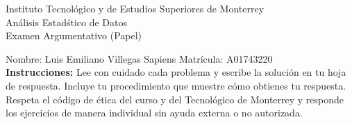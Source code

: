\documentclass[10pt]{report}
\begin{document}
\newpage



\begin{center}
{\large Instituto Tecnol\'{o}gico y de Estudios Superiores de Monterrey \\
An\'alisis Estad\'stico de Datos } \\
Examen Argumentativo (Papel)
\end{center}

Nombre: \underline{\hspace*{.2in}}
Luis Emiliano Villegas Sapiens
\underline{\hspace*{.2in}} \quad Matr\'icula:\underline{\hspace*{.2in}}
A01743220
\underline{\hspace*{.2in}} \\

{\bf Instrucciones:} Lee con cuidado cada problema y escribe la soluci\'on
en tu hoja de respuesta. Incluye tu procedimiento que muestre c\'omo obtienes tu respuesta.  Respeta el c\'odigo de \'etica del curso y del Tecnol\'ogico de Monterrey y responde los ejercicios de manera individual sin ayuda externa o no autorizada.
\end{document}
